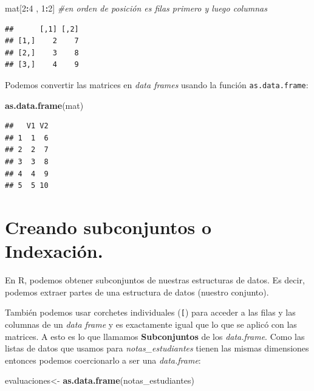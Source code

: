 \documentclass[
]{book}
\newenvironment{Shaded}{\begin{snugshade}}{\end{snugshade}}
\newcommand{\CommentTok}[1]{\textcolor[rgb]{0.56,0.35,0.01}{\textit{#1}}}
\newcommand{\DecValTok}[1]{\textcolor[rgb]{0.00,0.00,0.81}{#1}}
\newcommand{\FunctionTok}[1]{\textcolor[rgb]{0.13,0.29,0.53}{\textbf{#1}}}
\newcommand{\NormalTok}[1]{#1}
\newcommand{\OtherTok}[1]{\textcolor[rgb]{0.56,0.35,0.01}{#1}}
\newcommand{\SpecialCharTok}[1]{\textcolor[rgb]{0.81,0.36,0.00}{\textbf{#1}}}
\begin{document}
\begin{Shaded}
\begin{Highlighting}[]
\NormalTok{mat[}\DecValTok{2}\SpecialCharTok{:}\DecValTok{4}\NormalTok{ , }\DecValTok{1}\SpecialCharTok{:}\DecValTok{2}\NormalTok{]  }\CommentTok{\#en orden de posición es filas primero y luego columnas}
\end{Highlighting}
\end{Shaded}

\begin{verbatim}
##      [,1] [,2]
## [1,]    2    7
## [2,]    3    8
## [3,]    4    9
\end{verbatim}

Podemos convertir las matrices en \emph{data frames} usando la función \texttt{as.data.frame}:

\begin{Shaded}
\begin{Highlighting}[]
\FunctionTok{as.data.frame}\NormalTok{(mat)}
\end{Highlighting}
\end{Shaded}

\begin{verbatim}
##   V1 V2
## 1  1  6
## 2  2  7
## 3  3  8
## 4  4  9
## 5  5 10
\end{verbatim}

\section{Creando subconjuntos o Indexación.}\label{creando-subconjuntos-o-indexaciuxf3n.}

En R, podemos obtener subconjuntos de nuestras estructuras de datos.
Es decir, podemos extraer partes de una estructura de datos (nuestro conjunto).

También podemos usar corchetes individuales (\texttt{{[}}) para acceder a las filas y las columnas de un \emph{data frame} y es exactamente igual que lo que se aplicó con las matrices.
A esto es lo que llamamos \textbf{Subconjuntos} de los \emph{data.frame}.
Como las listas de datos que usamos para \emph{notas\_estudiantes} tienen las mismas dimensiones entonces podemos coercionarlo a ser una \emph{data.frame}:

\begin{Shaded}
\begin{Highlighting}[]
\NormalTok{evaluaciones}\OtherTok{\textless{}{-}} \FunctionTok{as.data.frame}\NormalTok{(notas\_estudiantes)}
\end{Highlighting}
\end{Shaded}
\end{document}
